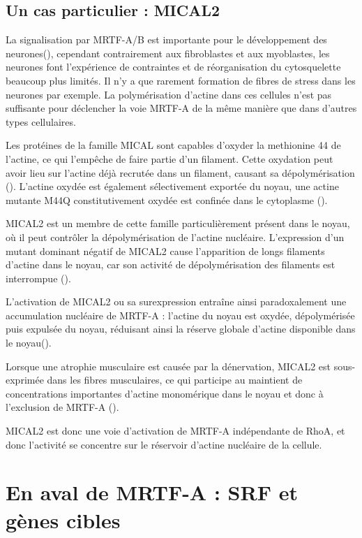 \documentclass{report}
\begin{document}
\subsection{Un cas particulier : MICAL2}

La signalisation par MRTF-A/B est importante pour le développement des neurones(\cite{kalita_mkls:_2012}), cependant contrairement aux fibroblastes et aux myoblastes, les neurones font l'expérience de contraintes et de réorganisation du cytosquelette beaucoup plus limités. Il n'y a que rarement formation de fibres de stress dans les neurones par exemple. La polymérisation d'actine dans ces cellules n'est pas suffisante pour déclencher la voie MRTF-A de la même manière que dans d'autres types cellulaires. 

Les protéines de la famille MICAL sont capables d'oxyder la methionine 44 de l'actine, ce qui l'empêche de faire partie d'un filament. Cette oxydation peut avoir lieu sur l'actine déjà recrutée dans un filament, causant sa dépolymérisation (\cite{hung_direct_2011}). L'actine oxydée est également sélectivement exportée du noyau, une actine mutante M44Q constitutivement oxydée est confinée dans le cytoplasme (\cite{lundquist_redox_2014}).

MICAL2 est un membre de cette famille particulièrement présent dans le noyau, où il peut contrôler la dépolymérisation de l'actine nucléaire. L'expression d'un mutant dominant négatif de MICAL2 cause l'apparition de longs filaments d'actine dans le noyau, car son activité de dépolymérisation des filaments est interrompue (\cite{lundquist_redox_2014}). 

L'activation de MICAL2 ou sa surexpression entraîne ainsi paradoxalement une accumulation nucléaire de MRTF-A : l'actine du noyau est oxydée, dépolymérisée puis expulsée du noyau, réduisant ainsi la réserve globale d'actine disponible dans le noyau(\cite{lundquist_redox_2014}). 

Lorsque une atrophie musculaire est causée par la dénervation, MICAL2 est sous-exprimée dans les fibres musculaires, ce qui participe au maintient de concentrations importantes d'actine monomérique dans le noyau et donc à l'exclusion de MRTF-A (\cite{collard_nuclear_2014}). 

MICAL2 est donc une voie d'activation de MRTF-A indépendante de RhoA, et donc l'activité se concentre sur le réservoir d'actine nucléaire de la cellule. 


\section{En aval de MRTF-A : SRF et gènes cibles}
\end{document}
